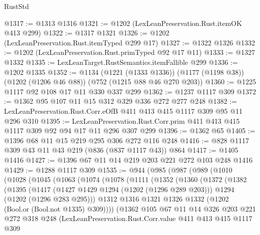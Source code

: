\begin{lexlean}{RustStd}
\begin{coremodule}
@1317 := @1313 @1316
@1321 := @1202 (LexLeanPreservation.Rust.itemOK @413 @299)
@1322 := @1317 @1321
@1326 := @1202 (LexLeanPreservation.Rust.itemTyped @299 @17)
@1327 := @1322 @1326
@1332 := @1202 (LexLeanPreservation.Rust.primTyped @92 @17 @11)
@1333 := @1327 @1332
@1335 := LexLeanTarget.RustSemantics.itemFallible @299
@1336 := @1202 @1335
@1352 := @1134
    (@1221 (@1333 @1336))
    (@1177 (@1198 @38))
    (@1202 (@1206 @46 @88))
    (@752 (@1215 @88 @46 @270 @203))
@1360 := @1225 @1117 @92 @108 @17 @11 @330 @337 @299
@1362 := @1237 @1117 @309
@1372 := @1362 @95 @107 @11 @15 @312 @329 @336 @272 @277 @248
@1382 := LexLeanPreservation.Rust.Corr.eOfB @411 @413 @415 @1117 @309 @95 @11 @296 @310
@1395 := LexLeanPreservation.Rust.Corr.prim @411 @413 @415 @1117 @309 @92 @94 @17 @11 @296 @307 @299
@1396 := @1362 @65
@1405 := @1396 @68 @11 @15 @219 @295 @306 @272 @116 @248
@1416 := @828 @1117 @309 @43 @11 @43 @219 (@836 (@837 @1117 @43)) @864
@1417 := @1405 @1416
@1427 := @1396 @67 @11 @14 @219 @203 @221 @272 @103 @248 @1416
@1429 := @1288 @1117 @309
@1535 := @944
    (@985
      (@987
        (@989
          (@1010
            (@1028
              (@1045
                (@1063
                  (@1074
                    (@1078
                      (@1111
                        (@1352
                          (@1360
                            (@1372
                              (@1382
                                (@1395
                                  (@1417
                                    (@1427 @1429 @1294 (@1202 (@1296 @289 @203)))
                                    @1294
                                    (@1202 (@1296 @283 @295)))
                                  @1312
                                  @1316
                                  @1321
                                  @1326
                                  @1332
                                  (@1202 (Bool.or (Bool.not @1335) @309))))
                              (@1362
                                @105
                                @67
                                @11
                                @14
                                @326
                                @203
                                @221
                                @272
                                @318
                                @248
                                (LexLeanPreservation.Rust.Corr.value
                                  @411
                                  @413
                                  @415
                                  @1117
                                  @309

\end{coremodule}
\end{lexlean}
